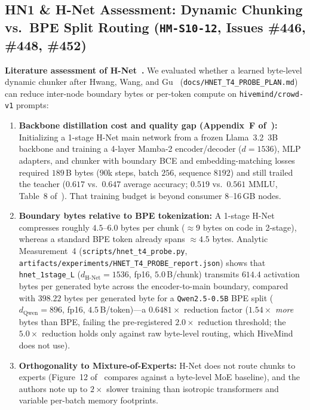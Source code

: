 \documentclass[11pt,a4paper]{article}
\begin{document}
\subsection{HN1 \& H-Net Assessment: Dynamic Chunking vs.\ BPE Split Routing (\texttt{HM-S10-12}, Issues \#446, \#448, \#452)}
\label{sec:hn1_hnet}

\textbf{Literature assessment of H-Net~\cite{hwang2025hnet}.} We evaluated whether a learned byte-level dynamic chunker after Hwang, Wang, and Gu~\cite{hwang2025hnet} (\texttt{docs/\allowbreak HNET\_\allowbreak T4\_\allowbreak PROBE\_\allowbreak PLAN.md}) can reduce inter-node boundary bytes or per-token compute on \texttt{hivemind/crowd-v1} prompts:
\begin{enumerate}[leftmargin=1.8em]
    \item \textbf{Backbone distillation cost and quality gap (Appendix~F of~\cite{hwang2025hnet}):} Initializing a 1-stage H-Net main network from a frozen Llama~3.2~3B backbone and training a 4-layer Mamba-2 encoder/decoder ($d=1536$), MLP adapters, and chunker with boundary BCE and embedding-matching losses required $189$\,B bytes ($90$k steps, batch $256$, sequence $8192$) and still trailed the teacher ($0.617$ vs.\ $0.647$ average accuracy; $0.519$ vs.\ $0.561$ MMLU, Table~8 of~\cite{hwang2025hnet}). That training budget is beyond consumer 8--16\,GB nodes.
    \item \textbf{Boundary bytes relative to BPE tokenization:} A 1-stage H-Net compresses roughly $4.5$--$6.0$ bytes per chunk ($\approx 9$ bytes on code in 2-stage), whereas a standard BPE token already spans $\approx 4.5$ bytes. Analytic Measurement~4 (\texttt{scripts/\allowbreak hnet\_\allowbreak t4\_\allowbreak probe.py}, \texttt{artifacts/\allowbreak experiments/\allowbreak HNET\_\allowbreak T4\_\allowbreak PROBE\_\allowbreak report.json}) shows that \texttt{hnet\_1stage\_L} ($d_{\text{H-Net}}=1536$, fp16, $5.0$\,B/chunk) transmits $614.4$ activation bytes per generated byte across the encoder-to-main boundary, compared with $398.22$ bytes per generated byte for a \texttt{Qwen2.5-0.5B} BPE split ($d_{\text{Qwen}}=896$, fp16, $4.5$\,B/token)---a $0.6481\times$ reduction factor ($1.54\times$ \emph{more} bytes than BPE, failing the pre-registered $2.0\times$ reduction threshold; the $5.0\times$ reduction holds only against raw byte-level routing, which HiveMind does not use).
    \item \textbf{Orthogonality to Mixture-of-Experts:} H-Net does not route chunks to experts (Figure~12 of~\cite{hwang2025hnet} compares against a byte-level MoE baseline), and the authors note up to $2\times$ slower training than isotropic transformers and variable per-batch memory footprints.
\end{enumerate}
\end{document}
